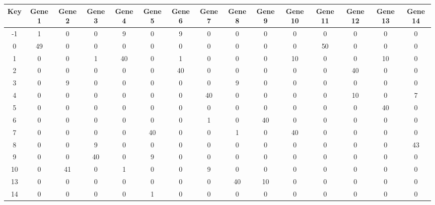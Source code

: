 \begin{tabular}{|c|c|c|c|c|c|c|c|c|c|c|c|c|c|c|}
\hline
Key & Gene 1 & Gene 2 & Gene 3 & Gene 4 & Gene 5 & Gene 6 & Gene 7 & Gene 8 & Gene 9 & Gene 10 & Gene 11 & Gene 12 & Gene 13 & Gene 14 \\
\hline
-1 & 1 & 0 & 0 & 9 & 0 & 9 & 0 & 0 & 0 & 0 & 0 & 0 & 0 & 0 \\
0 & 49 & 0 & 0 & 0 & 0 & 0 & 0 & 0 & 0 & 0 & 50 & 0 & 0 & 0 \\
1 & 0 & 0 & 1 & 40 & 0 & 1 & 0 & 0 & 0 & 10 & 0 & 0 & 10 & 0 \\
2 & 0 & 0 & 0 & 0 & 0 & 40 & 0 & 0 & 0 & 0 & 0 & 40 & 0 & 0 \\
3 & 0 & 9 & 0 & 0 & 0 & 0 & 0 & 9 & 0 & 0 & 0 & 0 & 0 & 0 \\
4 & 0 & 0 & 0 & 0 & 0 & 0 & 40 & 0 & 0 & 0 & 0 & 10 & 0 & 7 \\
5 & 0 & 0 & 0 & 0 & 0 & 0 & 0 & 0 & 0 & 0 & 0 & 0 & 40 & 0 \\
6 & 0 & 0 & 0 & 0 & 0 & 0 & 1 & 0 & 40 & 0 & 0 & 0 & 0 & 0 \\
7 & 0 & 0 & 0 & 0 & 40 & 0 & 0 & 1 & 0 & 40 & 0 & 0 & 0 & 0 \\
8 & 0 & 0 & 9 & 0 & 0 & 0 & 0 & 0 & 0 & 0 & 0 & 0 & 0 & 43 \\
9 & 0 & 0 & 40 & 0 & 9 & 0 & 0 & 0 & 0 & 0 & 0 & 0 & 0 & 0 \\
10 & 0 & 41 & 0 & 1 & 0 & 0 & 9 & 0 & 0 & 0 & 0 & 0 & 0 & 0 \\
13 & 0 & 0 & 0 & 0 & 0 & 0 & 0 & 40 & 10 & 0 & 0 & 0 & 0 & 0 \\
14 & 0 & 0 & 0 & 0 & 1 & 0 & 0 & 0 & 0 & 0 & 0 & 0 & 0 & 0 \\
\hline
\end{tabular}